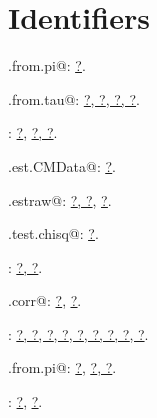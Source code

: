 \documentclass[reqno]{amsart}
\renewcommand{\NWlink}[2]{\hyperlink{#1}{#2}}
\begin{document}
\section{Identifiers}


{\small\begin{list}{}{\setlength{\itemsep}{-\parsep}\setlength{\itemindent}{-\leftmargin}}
\item \verb@corr.from.pi@: \underline{\NWlink{nuweb?}{?}}.
\item \verb@corr.from.tau@: \underline{\NWlink{nuweb?}{?}}\NWlink{nuweb?}{, ?}\NWlink{nuweb?}{, ?}\NWlink{nuweb?}{, ?}.
\item \verb@Marginals@: \NWlink{nuweb?}{?}, \underline{\NWlink{nuweb?}{?}}\NWlink{nuweb?}{, ?}.
\item \verb@mc.est.CMData@: \underline{\NWlink{nuweb?}{?}}.
\item \verb@mc.estraw@: \NWlink{nuweb?}{?}\NWlink{nuweb?}{, ?}, \underline{\NWlink{nuweb?}{?}}.
\item \verb@mc.test.chisq@: \underline{\NWlink{nuweb?}{?}}.
\item \verb@mChoose@: \underline{\NWlink{nuweb?}{?}}\NWlink{nuweb?}{, ?}.
\item \verb@multi.corr@: \NWlink{nuweb?}{?}, \underline{\NWlink{nuweb?}{?}}.
\item \verb@tau@: \underline{\NWlink{nuweb?}{?}}\NWlink{nuweb?}{, ?}\NWlink{nuweb?}{, ?}\NWlink{nuweb?}{, ?}\NWlink{nuweb?}{, ?}\NWlink{nuweb?}{, ?}\NWlink{nuweb?}{, ?}\NWlink{nuweb?}{, ?}\NWlink{nuweb?}{, ?}.
\item \verb@tau.from.pi@: \NWlink{nuweb?}{?}, \underline{\NWlink{nuweb?}{?}}\NWlink{nuweb?}{, ?}.
\item \verb@uniprobs@: \NWlink{nuweb?}{?}, \underline{\NWlink{nuweb?}{?}}.
\end{list}}
\end{document}
